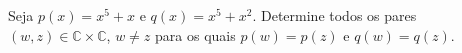 Seja \(p(x)=x^5+x\) e \(q(x)=x^5+x^2\). Determine todos os pares \((w,z)\in \mathbb{C}\times\mathbb{C}\), \(w\not=z\) para os quais \(p(w)=p(z)\) e \(q(w)=q(z)\).
